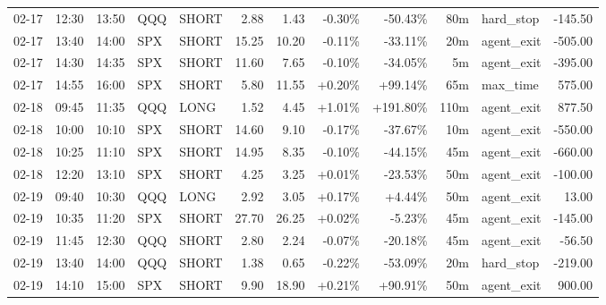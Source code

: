 \documentclass[11pt,a4paper,twoside]{article}
\begin{document}
\begin{center}
\begin{longtable}{>{\color{txtmain}}l l l l l r r r r r >{\color{txtmain}}l r}
02-17 & 12:30 & 13:50 & QQQ & SHORT & 2.88 & 1.43 & \textcolor{lossred}{-0.30\%} & \textcolor{lossred}{-50.43\%} & 80m & hard\_stop & \textcolor{lossred}{-145.50} \\
02-17 & 13:40 & 14:00 & SPX & SHORT & 15.25 & 10.20 & \textcolor{lossred}{-0.11\%} & \textcolor{lossred}{-33.11\%} & 20m & agent\_exit & \textcolor{lossred}{-505.00} \\
02-17 & 14:30 & 14:35 & SPX & SHORT & 11.60 & 7.65 & \textcolor{lossred}{-0.10\%} & \textcolor{lossred}{-34.05\%} & 5m & agent\_exit & \textcolor{lossred}{-395.00} \\
02-17 & 14:55 & 16:00 & SPX & SHORT & 5.80 & 11.55 & \textcolor{wingreen}{+0.20\%} & \textcolor{wingreen}{+99.14\%} & 65m & max\_time & \textcolor{wingreen}{575.00} \\
02-18 & 09:45 & 11:35 & QQQ & LONG & 1.52 & 4.45 & \textcolor{wingreen}{+1.01\%} & \textcolor{wingreen}{+191.80\%} & 110m & agent\_exit & \textcolor{wingreen}{877.50} \\
02-18 & 10:00 & 10:10 & SPX & SHORT & 14.60 & 9.10 & \textcolor{lossred}{-0.17\%} & \textcolor{lossred}{-37.67\%} & 10m & agent\_exit & \textcolor{lossred}{-550.00} \\
02-18 & 10:25 & 11:10 & SPX & SHORT & 14.95 & 8.35 & \textcolor{lossred}{-0.10\%} & \textcolor{lossred}{-44.15\%} & 45m & agent\_exit & \textcolor{lossred}{-660.00} \\
02-18 & 12:20 & 13:10 & SPX & SHORT & 4.25 & 3.25 & \textcolor{wingreen}{+0.01\%} & \textcolor{lossred}{-23.53\%} & 50m & agent\_exit & \textcolor{lossred}{-100.00} \\
02-19 & 09:40 & 10:30 & QQQ & LONG & 2.92 & 3.05 & \textcolor{wingreen}{+0.17\%} & \textcolor{wingreen}{+4.44\%} & 50m & agent\_exit & \textcolor{wingreen}{13.00} \\
02-19 & 10:35 & 11:20 & SPX & SHORT & 27.70 & 26.25 & \textcolor{wingreen}{+0.02\%} & \textcolor{lossred}{-5.23\%} & 45m & agent\_exit & \textcolor{lossred}{-145.00} \\
02-19 & 11:45 & 12:30 & QQQ & SHORT & 2.80 & 2.24 & \textcolor{lossred}{-0.07\%} & \textcolor{lossred}{-20.18\%} & 45m & agent\_exit & \textcolor{lossred}{-56.50} \\
02-19 & 13:40 & 14:00 & QQQ & SHORT & 1.38 & 0.65 & \textcolor{lossred}{-0.22\%} & \textcolor{lossred}{-53.09\%} & 20m & hard\_stop & \textcolor{lossred}{-219.00} \\
02-19 & 14:10 & 15:00 & SPX & SHORT & 9.90 & 18.90 & \textcolor{wingreen}{+0.21\%} & \textcolor{wingreen}{+90.91\%} & 50m & agent\_exit & \textcolor{wingreen}{900.00} \\

\end{longtable}
\end{center}
\end{document}
